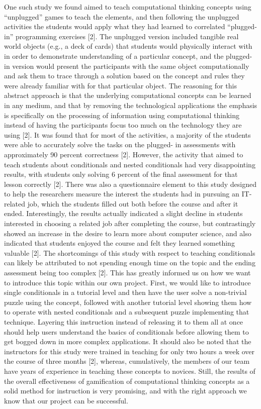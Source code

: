 \documentclass{article}
\begin{document}
One such study we found aimed to teach computational thinking concepts using
“unplugged” games to teach the elements, and then following the unplugged
activities the students would apply what they had learned to correlated
“plugged-in” programming exercises [2]. The unplugged version included tangible
real world objects (e.g., a deck of cards) that students would physically
interact with in order to demonstrate understanding of a particular concept, and
the plugged-in version would present the participants with the same object
computationally and ask them to trace through a solution based on the concept
and rules they were already familiar with for that particular object. The
reasoning for this abstract approach is that the underlying computational
concepts can be learned in any medium, and that by removing the technological
applications the emphasis is specifically on the processing of information using
computational thinking instead of having the participants focus too much on the
technology they are using [2]. It was found that for most of the activities, a
majority of the students were able to accurately solve the tasks on the plugged-
in assessments with approximately 90 percent correctness [2]. However, the
activity that aimed to teach students about conditionals and nested conditionals
had very disappointing results, with students only solving 6 percent of the final
assessment for that lesson correctly [2]. There was also a questionnaire element
to this study designed to help the researchers measure the interest the students
had in pursuing an IT-related job, which the students filled out both before the
course and after it ended. Interestingly, the results actually indicated a
slight decline in students interested in choosing a related job after completing
the course, but contrastingly showed an increase in the desire to learn more
about computer science, and also indicated that students enjoyed the course and
felt they learned something valuable [2]. The shortcomings of this study with
respect to teaching conditionals can likely be attributed to not spending enough
time on the topic and the ending assessment being too complex [2]. This has
greatly informed us on how we want to introduce this topic within our own
project. First, we would like to introduce single conditionals in a tutorial
level and then have the user solve a non-trivial puzzle using the concept,
followed with another tutorial level showing them how to operate with nested
conditionals and a subsequent puzzle implementing that technique. Layering this
instruction instead of releasing it to them all at once should help users
understand the basics of conditionals before allowing them to get bogged down in
more complex applications. It should also be noted that the instructors for this
study were trained in teaching for only two hours a week over the course of
three months [2], whereas, cumulatively, the members of our team have years of
experience in teaching these concepts to novices. Still, the results of the
overall effectiveness of gamification of computational thinking concepts as a
solid method for instruction is very promising, and with the right approach we
know that our project can be successful.\\
\end{document}
